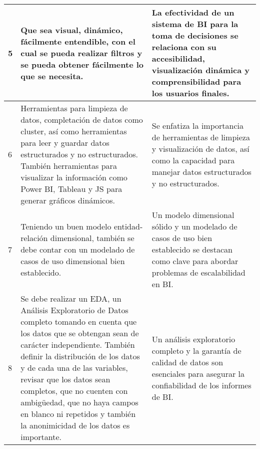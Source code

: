 \begin{longtable}{|p{0.6cm}|p{6cm}|p{6cm}|}
    5                                                 & Que sea visual, dinámico, fácilmente entendible, con el cual se pueda realizar filtros y se pueda obtener fácilmente lo que se necesita.                                                                                                                                                                                                                                                              & La efectividad de un sistema de BI para la toma de decisiones se relaciona con su accesibilidad, visualización dinámica y comprensibilidad para los usuarios finales.                                                 \\\hline
    6                                                 & Herramientas para limpieza de datos, completación de datos como cluster, así como herramientas para leer y guardar datos estructurados y no estructurados. También herramientas para visualizar la información como Power BI, Tableau y JS para generar gráficos dinámicos.                                                                                                                           & Se enfatiza la importancia de herramientas de limpieza y visualización de datos, así como la capacidad para manejar datos estructurados y no estructurados.                                                           \\\hline
    7                                                 & Teniendo un buen modelo entidad-relación dimensional, también se debe contar con un modelado de casos de uso dimensional bien establecido.                                                                                                                                                                                                                                                            & Un modelo dimensional sólido y un modelado de casos de uso bien establecido se destacan como clave para abordar problemas de escalabilidad en BI.                                                                     \\\hline
    8                                                 & Se debe realizar un EDA, un Análisis Exploratorio de Datos completo tomando en cuenta que los datos que se obtengan sean de carácter independiente. También definir la distribución de los datos y de cada una de las variables, revisar que los datos sean completos, que no cuenten con ambigüedad, que no haya campos en blanco ni repetidos y también la anonimicidad de los datos es importante. & Un análisis exploratorio completo y la garantía de calidad de datos son esenciales para asegurar la confiabilidad de los informes de BI.                                                                              \\\hline

\end{longtable}
